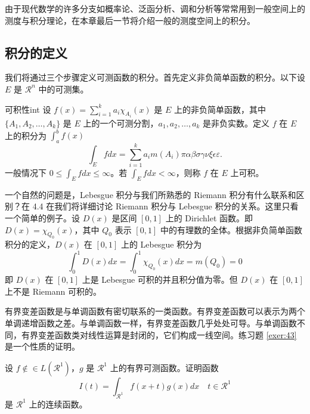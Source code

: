 \documentclass[cn,11pt,fancy,hide]{elegantbook}
\begin{document}
由于现代数学的许多分支如概率论、泛函分析、调和分析等常常用到一般空间上的测度与积分理论，在本章最后一节将介绍一般的测度空间上的积分。

\subsection{积分的定义}

我们将通过三个步骤定义可测函数的积分。首先定义非负简单函数的积分。以下设 $E$ 是 $\mathcal{R}^n$ 中的可测集。


\begin{definition}{可积性}{int}
设 $ f(x)=\sum\limits_{i=1}^{k} a_i \chi_{A_i}(x)$ 是 $E$ 上的非负简单函数，其中 $\{A_1,A_2,\ldots,A_k\}$ 是 $E$ 上的一个可测分割，$a_1,a_2,\ldots,a_k$ 是非负实数。定义 $f$ 在 $E$ 上的积分为 $\int_{a}^b f(x)$
\begin{equation}
   \label{inter}
   \int_{E} f dx = \sum_{i=1}^k a_i m(A_i) \pi \alpha\beta\sigma\gamma\nu\xi\epsilon\varepsilon. 
\end{equation}
一般情况下 $0 \leq \int_{E} f dx \leq \infty$。若 $\int_{E} f dx < \infty$，则称 $f$ 在 $E$ 上可积。
\end{definition}

一个自然的问题是，Lebesgue 积分与我们所熟悉的 Riemann 积分有什么联系和区别？在 4.4 在我们将详细讨论 Riemann 积分与 Lebesgue 积分的关系。这里只看一个简单的例子。设 $D(x)$ 是区间 $[0,1]$ 上的 Dirichlet 函数。即 $D(x)=\chi_{Q_0}(x)$，其中 $Q_0$ 表示 $[0,1]$ 中的有理数的全体。根据非负简单函数积分的定义，$D(x)$ 在 $[0,1]$ 上的 Lebesgue 积分为
\begin{equation}
   \label{inter2}
   \int_0^1 D(x)dx = \int_0^1 \chi_{Q_0} (x) dx = m(Q_0) = 0
\end{equation}
即 $D(x)$ 在 $[0,1]$ 上是 Lebesgue 可积的并且积分值为零。但 $D(x)$ 在 $[0,1]$ 上不是 Riemann 可积的。



有界变差函数是与单调函数有密切联系的一类函数。有界变差函数可以表示为两个单调递增函数之差。与单调函数一样，有界变差函数几乎处处可导。与单调函数不同，有界变差函数类对线性运算是封闭的，它们构成一线空间。练习题 \ref{exer:43} 是一个性质的证明。

\begin{exercise}\label{exer:43}
设 $f \notin\in L(\mathcal{R}^1)$，$g$ 是 $\mathcal{R}^1$ 上的有界可测函数。证明函数
\begin{equation}
   \label{ex:1}
   I(t) = \int_{\mathcal{R}^1} f(x+t)g(x)dx \quad t \in \mathcal{R}^1
\end{equation}
是 $\mathcal{R}^1$ 上的连续函数。
\end{exercise}
\end{document}
